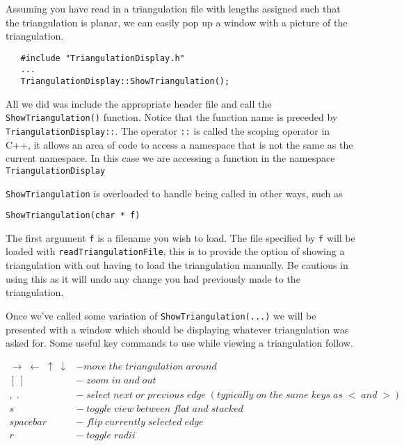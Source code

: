 \documentclass{amsart}
\theoremstyle{plain}
\numberwithin{equation}{section}
\begin{document}
Assuming you have read in a triangulation file with lengths assigned such that the triangulation is planar, we can easily pop up a window with a picture of the triangulation.\\

\begin{verbatim}
   #include "TriangulationDisplay.h"
   ...
   TriangulationDisplay::ShowTriangulation();
\end{verbatim}

\bigskip

All we did was include the appropriate header file and call the \verb|ShowTriangulation()| function. Notice that the function name is preceded by \verb|TriangulationDisplay::|. The operator \verb|::| is called the scoping operator in C++, it allows an area of code to access a namespace that is not the same as the current namespace. In this case we are accessing a function in the namespace \verb|TriangulationDisplay|

\verb|ShowTriangulation| is overloaded to handle being called in other ways, such as\\

\begin{verbatim}
ShowTriangulation(char * f)
\end{verbatim}

\bigskip

The first argument \verb|f| is a filename you wish to load. The file specified by \verb|f| will be loaded with \verb|readTriangulationFile|, this is to provide the option of showing a triangulation with out having to load the triangulation manually. Be cautious in using this as it will undo any change you had previously made to the triangulation.

Once we've called some variation of \verb|ShowTriangulation(...)| we will be presented with a window which should be displaying whatever triangulation was asked for. Some useful key commands to use while viewing a triangulation follow.

\begin{align*}
\rightarrow\;\leftarrow\;\uparrow\;\downarrow &- move\;the \;triangulation \;around\\
[\;] &- \;zoom\; in\; and\; out\\
,\;. &- \;select\; next\; or\; previous\; edge\; (typically\; on\; the \; same \; keys \; as\; <\; and\; >)\\
s &- \; toggle \; view \; between\; flat\; and \; stacked\\
spacebar &- \; flip \; currently\; selected\; edge\\
r &- \;toggle\;radii\\
\end{align*}
\end{document}
